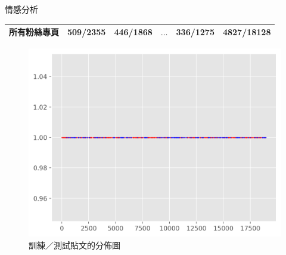 \documentclass[final,hyperref={pdfpagelabels=false}]{beamer}
\begin{document}
\begin{CJK}{UTF8}{bsmi}
\begin{frame}
\begin{minipage}{\textwidth}
\begin{block}{情感分析}
\begin{minipage}{0.39\textwidth}
\begin{table}[!htbp]
\begin{tabular}{@{}L{8.5cm}R{4.5cm}R{4.5cm}R{1.7cm}R{4.5cm}R{5.7cm}@{}}
  {\bfseries 所有粉絲專頁} & 509/2355 & 446/1868 & $\ldots$ & 336/1275 & 4827/18128 \\
  \bottomrule
  \end{tabular}
  \end{table}
\end{minipage}
\quad
\begin{minipage}{0.25\textwidth}
  \begin{figure}[!htbp]
  \setlength{\abovecaptionskip}{0pt plus 0pt minus 0pt}
  \setlength{\belowcaptionskip}{0pt plus 0pt minus 0pt}
  \centering
  \includegraphics[width=\columnwidth]{meta}
  \caption{訓練／測試貼文的分佈圖}
  \label{f3}
  \end{figure}
\end{minipage}
\end{block}
\end{minipage}


\end{frame}
\end{CJK}
\end{document}
